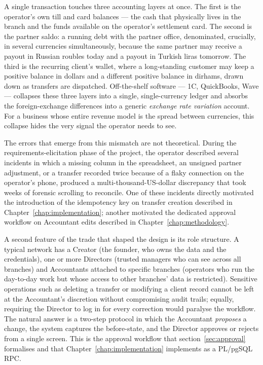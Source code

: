 A single transaction touches three accounting layers at once. The first is the operator's own till and card balances --- the cash that physically lives in the branch and the funds available on the operator's settlement card. The second is the partner saldo: a running debt with the partner office, denominated, crucially, in several currencies simultaneously, because the same partner may receive a payout in Russian roubles today and a payout in Turkish liras tomorrow. The third is the recurring client's wallet, where a long-standing customer may keep a positive balance in dollars and a different positive balance in dirhams, drawn down as transfers are dispatched. Off-the-shelf software --- 1C, QuickBooks, Wave --- collapses these three layers into a single, single-currency ledger and absorbs the foreign-exchange differences into a generic \emph{exchange rate variation} account. For a business whose entire revenue model is the spread between currencies, this collapse hides the very signal the operator needs to see.

The errors that emerge from this mismatch are not theoretical. During the requirements-elicitation phase of the project, the operator described several incidents in which a missing column in the spreadsheet, an unsigned partner adjustment, or a transfer recorded twice because of a flaky connection on the operator's phone, produced a multi-thousand-US-dollar discrepancy that took weeks of forensic scrolling to reconcile. One of these incidents directly motivated the introduction of the idempotency key on transfer creation described in Chapter~\ref{chap:implementation}; another motivated the dedicated approval workflow on Accountant edits described in Chapter~\ref{chap:methodology}.

A second feature of the trade that shaped the design is its role structure. A typical network has a Creator (the founder, who owns the data and the credentials), one or more Directors (trusted managers who can see across all branches) and Accountants attached to specific branches (operators who run the day-to-day work but whose access to other branches' data is restricted). Sensitive operations such as deleting a transfer or modifying a client record cannot be left at the Accountant's discretion without compromising audit trails; equally, requiring the Director to log in for every correction would paralyse the workflow. The natural answer is a two-step protocol in which the Accountant \emph{proposes} a change, the system captures the before-state, and the Director approves or rejects from a single screen. This is the approval workflow that section~\ref{sec:approval} formalises and that Chapter~\ref{chap:implementation} implements as a PL/pgSQL RPC.

